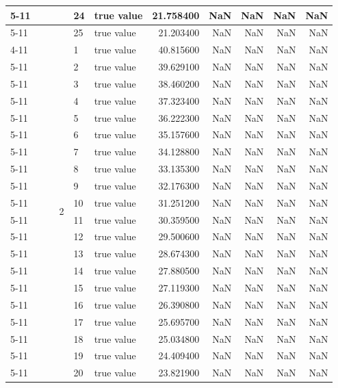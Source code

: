 \begin{tabular}{llllllrrrrr}
\cline{5-11}
 &  &  &  & 24 & true value & 21.758400 & NaN & NaN & NaN & NaN \\
\cline{5-11}
 &  &  &  & 25 & true value & 21.203400 & NaN & NaN & NaN & NaN \\
\cline{4-11} \cline{5-11}
 &  &  & \multirow[t]{25}{*}{2} & 1 & true value & 40.815600 & NaN & NaN & NaN & NaN \\
\cline{5-11}
 &  &  &  & 2 & true value & 39.629100 & NaN & NaN & NaN & NaN \\
\cline{5-11}
 &  &  &  & 3 & true value & 38.460200 & NaN & NaN & NaN & NaN \\
\cline{5-11}
 &  &  &  & 4 & true value & 37.323400 & NaN & NaN & NaN & NaN \\
\cline{5-11}
 &  &  &  & 5 & true value & 36.222300 & NaN & NaN & NaN & NaN \\
\cline{5-11}
 &  &  &  & 6 & true value & 35.157600 & NaN & NaN & NaN & NaN \\
\cline{5-11}
 &  &  &  & 7 & true value & 34.128800 & NaN & NaN & NaN & NaN \\
\cline{5-11}
 &  &  &  & 8 & true value & 33.135300 & NaN & NaN & NaN & NaN \\
\cline{5-11}
 &  &  &  & 9 & true value & 32.176300 & NaN & NaN & NaN & NaN \\
\cline{5-11}
 &  &  &  & 10 & true value & 31.251200 & NaN & NaN & NaN & NaN \\
\cline{5-11}
 &  &  &  & 11 & true value & 30.359500 & NaN & NaN & NaN & NaN \\
\cline{5-11}
 &  &  &  & 12 & true value & 29.500600 & NaN & NaN & NaN & NaN \\
\cline{5-11}
 &  &  &  & 13 & true value & 28.674300 & NaN & NaN & NaN & NaN \\
\cline{5-11}
 &  &  &  & 14 & true value & 27.880500 & NaN & NaN & NaN & NaN \\
\cline{5-11}
 &  &  &  & 15 & true value & 27.119300 & NaN & NaN & NaN & NaN \\
\cline{5-11}
 &  &  &  & 16 & true value & 26.390800 & NaN & NaN & NaN & NaN \\
\cline{5-11}
 &  &  &  & 17 & true value & 25.695700 & NaN & NaN & NaN & NaN \\
\cline{5-11}
 &  &  &  & 18 & true value & 25.034800 & NaN & NaN & NaN & NaN \\
\cline{5-11}
 &  &  &  & 19 & true value & 24.409400 & NaN & NaN & NaN & NaN \\
\cline{5-11}
 &  &  &  & 20 & true value & 23.821900 & NaN & NaN & NaN & NaN \\

\end{tabular}
